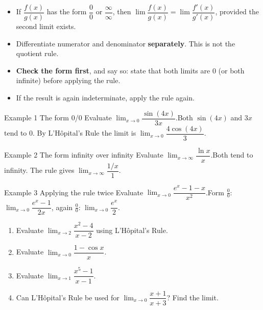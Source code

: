 \documentclass[11pt]{article}
\begin{document}

\begin{ideabox}
\begin{itemize}[leftmargin=*,itemsep=2pt,topsep=2pt]
  \item If $\dfrac{f(x)}{g(x)}$ has the form $\dfrac00$ or $\dfrac{\infty}{\infty}$, then $\displaystyle\lim\dfrac{f(x)}{g(x)}=\lim\dfrac{f'(x)}{g'(x)}$, provided the second limit exists.
  \item Differentiate numerator and denominator \textbf{separately}. This is not the quotient rule.
  \item \textbf{Check the form first}, and say so: state that both limits are 0 (or both infinite) before applying the rule.
  \item If the result is again indeterminate, apply the rule again.
\end{itemize}
\end{ideabox}

\begin{example}{Example 1 \textperiodcentered{} The form 0/0}
Evaluate $\displaystyle\lim_{x\to 0}\dfrac{\sin(4x)}{3x}$.\soln Both $\sin(4x)$ and $3x$ tend to 0. By L'H\^opital's Rule the limit is $\displaystyle\lim_{x\to 0}\dfrac{4\cos(4x)}{3}$.
\end{example}

\begin{example}{Example 2 \textperiodcentered{} The form infinity over infinity}
Evaluate $\displaystyle\lim_{x\to \infty}\dfrac{\ln x}{x}$.\soln Both tend to infinity. The rule gives $\displaystyle\lim_{x\to \infty}\dfrac{1/x}{1}$.
\end{example}

\begin{example}{Example 3 \textperiodcentered{} Applying the rule twice}
Evaluate $\displaystyle\lim_{x\to 0}\dfrac{e^{x}-1-x}{x^2}$.\soln Form $\tfrac00$: $\displaystyle\lim_{x\to 0}\dfrac{e^{x}-1}{2x}$, again $\tfrac00$: $\displaystyle\lim_{x\to 0}\dfrac{e^{x}}{2}$.
\end{example}

\newpage
{}

\begin{enumerate}[leftmargin=*,itemsep=2pt]
  \item Evaluate $\displaystyle\lim_{x\to 2}\dfrac{x^2-4}{x-2}$ using L'H\^opital's Rule.\work{2.3cm}
  \item Evaluate $\displaystyle\lim_{x\to 0}\dfrac{1-\cos x}{x}$.\work{2.3cm}
  \item Evaluate $\displaystyle\lim_{x\to 1}\dfrac{x^5-1}{x-1}$.\work{2.3cm}
  \item Can L'H\^opital's Rule be used for $\displaystyle\lim_{x\to 0}\dfrac{x+1}{x+3}$? Find the limit.\work{2.3cm}
\end{enumerate}
\end{document}

